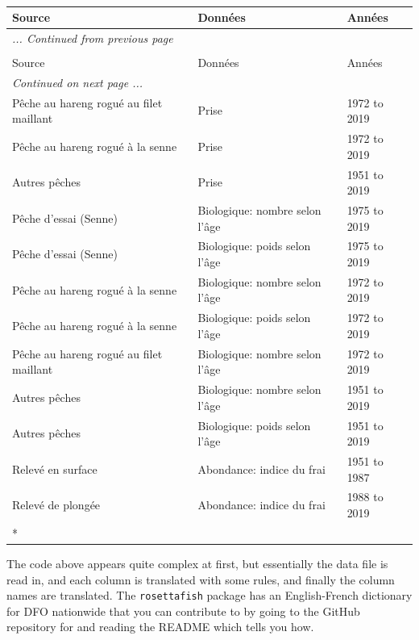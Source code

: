 \documentclass[12pt]{article}\usepackage[]{graphicx}\usepackage[]{color}
\begin{document}
\begin{longtable}[t]{lll} \caption{\label{tab:herring}}\\ \toprule Source & Données & Années\\ \midrule \endfirsthead \multicolumn{3}{l}{\textit{... Continued from previous page}} \\ \hline \caption*{}\\ \toprule Source & Données & Années\\ \midrule \endhead \hline \multicolumn{3}{l}{\textit{Continued on next page ...}} \\ \endfoot \bottomrule \endlastfoot Pêche au hareng rogué au filet maillant & Prise & 1972 to 2019\\ Pêche au hareng rogué à la senne & Prise & 1972 to 2019\\ Autres pêches & Prise & 1951 to 2019\\ Pêche d'essai (Senne) & Biologique: nombre selon l’âge & 1975 to 2019\\ Pêche d'essai (Senne) & Biologique: poids selon l’âge & 1975 to 2019\\ Pêche au hareng rogué à la senne & Biologique: nombre selon l’âge & 1972 to 2019\\ Pêche au hareng rogué à la senne & Biologique: poids selon l’âge & 1972 to 2019\\ Pêche au hareng rogué au filet maillant & Biologique: nombre selon l’âge & 1972 to 2019\\ Autres pêches & Biologique: nombre selon l’âge & 1951 to 2019\\ Autres pêches & Biologique: poids selon l’âge & 1951 to 2019\\ Relevé en surface & Abondance: indice du frai & 1951 to 1987\\ Relevé de plongée & Abondance: indice du frai & 1988 to 2019\\* \end{longtable}

The code above appears quite complex at first, but essentially the data file is read in, and each column is translated with some rules, and finally the column names are translated. The \texttt{rosettafish} package has an English-French dictionary for DFO nationwide that you can contribute to by going to the GitHub repository for  and reading the README which tells you how.
\end{document}
